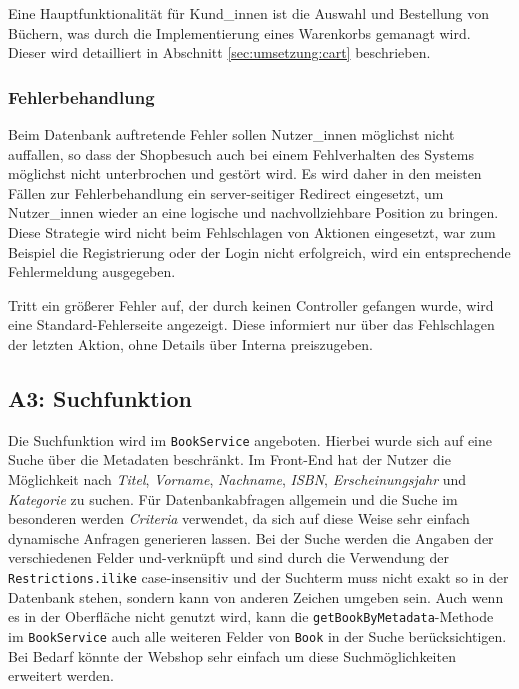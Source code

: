 		Eine Hauptfunktionalität für Kund\_innen ist die Auswahl und Bestellung von Büchern, was durch die Implementierung eines Warenkorbs gemanagt wird. Dieser wird detailliert in Abschnitt \ref{sec:umsetzung:cart} beschrieben. 
		
		\subsubsection{Fehlerbehandlung}
		Beim Datenbank auftretende Fehler sollen Nutzer\_innen möglichst nicht auffallen, so dass der Shopbesuch auch bei einem Fehlverhalten des Systems möglichst nicht unterbrochen und gestört wird. Es wird daher in den meisten Fällen zur Fehlerbehandlung ein server-seitiger Redirect eingesetzt, um Nutzer\_innen wieder an eine logische und nachvollziehbare Position zu bringen. Diese Strategie wird nicht beim Fehlschlagen von Aktionen eingesetzt, war zum Beispiel die Registrierung oder der Login nicht erfolgreich, wird ein entsprechende Fehlermeldung ausgegeben.
		
		Tritt ein größerer Fehler auf, der durch keinen Controller gefangen wurde, wird eine Standard-Fehlerseite angezeigt. Diese informiert nur über das Fehlschlagen der letzten Aktion, ohne Details über Interna preiszugeben.

	\subsection{A3: Suchfunktion}\label{umsetzung:Suche}
	Die Suchfunktion wird im \texttt{BookService} angeboten. Hierbei wurde sich auf eine Suche über die Metadaten beschränkt. Im Front-End hat der Nutzer die Möglichkeit nach \textit{Titel}, \textit{Vorname}, \textit{Nachname}, \textit{ISBN}, \textit{Erscheinungsjahr} und \textit{Kategorie} zu suchen. Für Datenbankabfragen allgemein und die Suche im besonderen werden \textit{Criteria} verwendet, da sich auf diese Weise sehr einfach dynamische Anfragen generieren lassen. Bei der Suche werden die Angaben der verschiedenen Felder und-verknüpft und sind durch die Verwendung der \texttt{Restrictions.ilike} case-insensitiv und der Suchterm muss nicht exakt so in der Datenbank stehen, sondern kann von anderen Zeichen umgeben sein.
	Auch wenn es in der Oberfläche nicht genutzt wird, kann die \texttt{getBookByMetadata}-Methode im \texttt{BookService} auch alle weiteren Felder von \texttt{Book} in der Suche berücksichtigen. Bei Bedarf könnte der Webshop sehr einfach um diese Suchmöglichkeiten erweitert werden.
	
